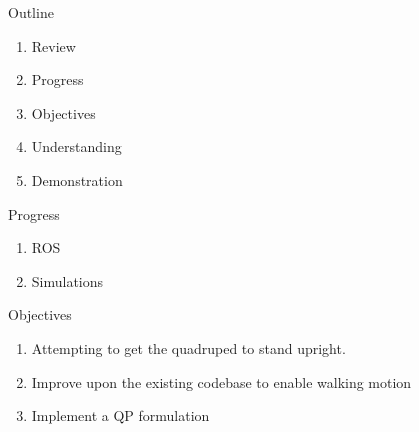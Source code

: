 \documentclass{beamer}
\begin{document}
\begin{frame}\titlepage\end{frame}\normalfont


\begin{frame}{Outline}
	\begin{enumerate}
            \item Review
		\item Progress
            \item Objectives
            \item Understanding
            \item Demonstration
	\end{enumerate}
\end{frame}\normalfont
\begin{frame}{Progress}
        \begin{enumerate}
            \item ROS
            \item Simulations
        \end{enumerate}
\end{frame}\normalfont
\begin{frame}{Objectives}
        \begin{enumerate}
            \item{Attempting to get the quadruped to stand upright.}
            \item{Improve upon the existing codebase to enable walking motion}
            \item{Implement a QP formulation}
        \end{enumerate}
\end{frame}\normalfont
\end{document}
